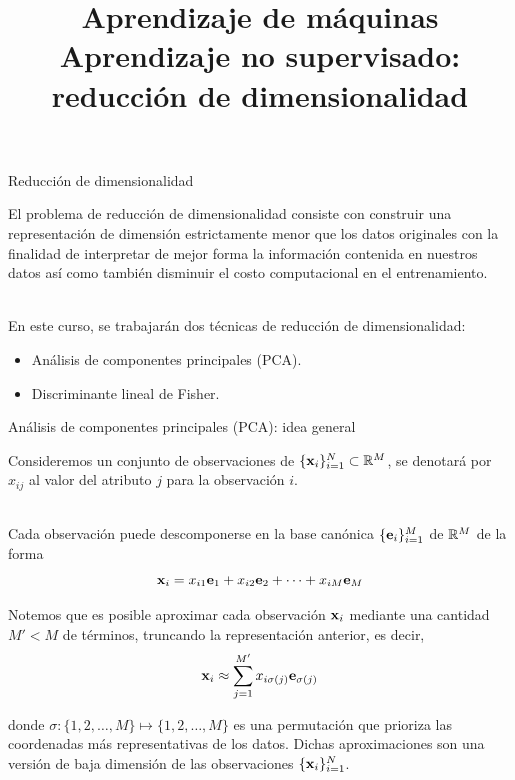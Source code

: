 \documentclass[9pt]{beamer}
\title{\textbf{Aprendizaje de máquinas} \\ Aprendizaje no supervisado: reducción de dimensionalidad}
\begin{document}
\begin{frame}
  \titlepage
\end{frame}

\begin{frame}{Reducción de dimensionalidad}

El problema de reducción de dimensionalidad consiste con construir una representación de dimensión estrictamente menor que los datos originales con la finalidad de interpretar de mejor forma la información contenida en nuestros datos así como también disminuir el costo computacional en el entrenamiento.\\~\ \pause

En este curso, se trabajarán dos técnicas de reducción de dimensionalidad:

\begin{itemize}
	\item Análisis de componentes principales (PCA).
	\item Discriminante lineal de Fisher.
\end{itemize}
	
\end{frame}

\begin{frame}{Análisis de componentes principales (PCA): idea general}

Consideremos un conjunto de observaciones de $\{\mathbf{x}_i\}_{i=1}^N\subset\mathbb{R}^M$, se denotará por $x_{ij}$ al valor del atributo $j$ para la observación $i$. \\~\ \pause

Cada observación puede descomponerse en la base canónica $\{\mathbf{e}_i\}_{i=1}^M$ de $\mathbb{R}^M$ de la forma 
\begin{equation*}
	\mathbf{x}_i = x_{i1}\mathbf{e}_1 +  x_{i2}\mathbf{e}_2 + \cdots + x_{iM}\mathbf{e}_M 		
\end{equation*}\pause

Notemos que es posible aproximar cada observación $\mathbf{x}_i$ mediante una cantidad $M'<M$ de términos, truncando la representación anterior, es decir,  
\begin{equation*}
	\mathbf{x}_i \approx \sum_{j=1}^{M'} x_{i\sigma(j)}\mathbf{e}_{\sigma(j)}
\end{equation*}

donde $\sigma:\{1,2,\ldots,M\}\mapsto\{1,2,\ldots,M\}$ es una permutación que prioriza las coordenadas más representativas de los datos. Dichas aproximaciones son una versión de baja dimensión de las observaciones $\{\mathbf{x}_i\}_{i=1}^N$.\\~\ 
\end{frame}
\end{document}
